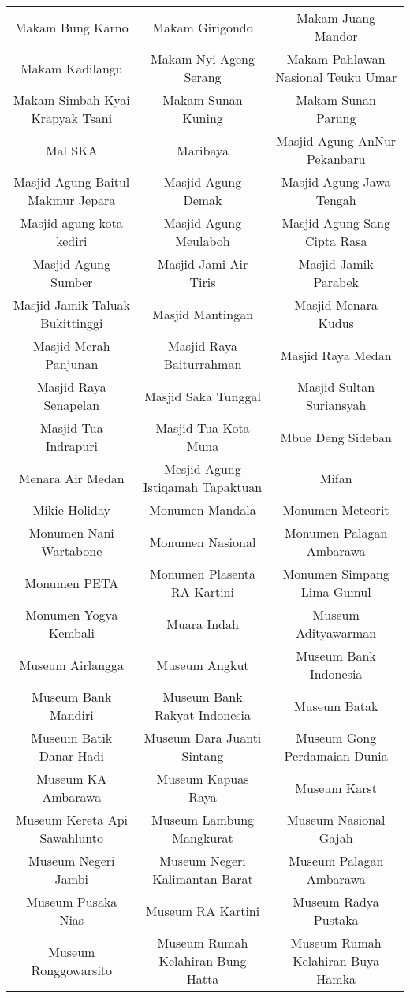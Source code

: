 \begin{table}[H]
\begin{tabular}{ c | c | c}
Makam Bung Karno & Makam Girigondo & Makam Juang Mandor\\
Makam Kadilangu & Makam Nyi Ageng Serang & Makam Pahlawan Nasional Teuku Umar\\
Makam Simbah Kyai Krapyak Tsani & Makam Sunan Kuning & Makam Sunan Parung\\
Mal SKA & Maribaya & Masjid Agung AnNur Pekanbaru\\
Masjid Agung Baitul Makmur Jepara & Masjid Agung Demak & Masjid Agung Jawa Tengah\\
Masjid agung kota kediri & Masjid Agung Meulaboh & Masjid Agung Sang Cipta Rasa\\
Masjid Agung Sumber & Masjid Jami Air Tiris & Masjid Jamik Parabek\\
Masjid Jamik Taluak Bukittinggi & Masjid Mantingan & Masjid Menara Kudus\\
Masjid Merah Panjunan & Masjid Raya Baiturrahman & Masjid Raya Medan\\
Masjid Raya Senapelan & Masjid Saka Tunggal & Masjid Sultan Suriansyah\\
Masjid Tua Indrapuri & Masjid Tua Kota Muna & Mbue Deng Sideban\\
Menara Air Medan & Mesjid Agung Istiqamah Tapaktuan & Mifan\\
Mikie Holiday & Monumen Mandala & Monumen Meteorit\\
Monumen Nani Wartabone & Monumen Nasional & Monumen Palagan Ambarawa\\
Monumen PETA & Monumen Plasenta RA Kartini & Monumen Simpang Lima Gumul\\
Monumen Yogya Kembali & Muara Indah & Museum Adityawarman\\
Museum Airlangga & Museum Angkut & Museum Bank Indonesia\\
Museum Bank Mandiri & Museum Bank Rakyat Indonesia & Museum Batak\\
Museum Batik Danar Hadi & Museum Dara Juanti Sintang & Museum Gong Perdamaian Dunia\\
Museum KA Ambarawa & Museum Kapuas Raya & Museum Karst\\
Museum Kereta Api Sawahlunto & Museum Lambung Mangkurat & Museum Nasional Gajah\\
Museum Negeri Jambi & Museum Negeri Kalimantan Barat & Museum Palagan Ambarawa\\
Museum Pusaka Nias & Museum RA Kartini & Museum Radya Pustaka\\
Museum Ronggowarsito & Museum Rumah Kelahiran Bung Hatta & Museum Rumah Kelahiran Buya Hamka\\

\end{tabular}
\end{table}
